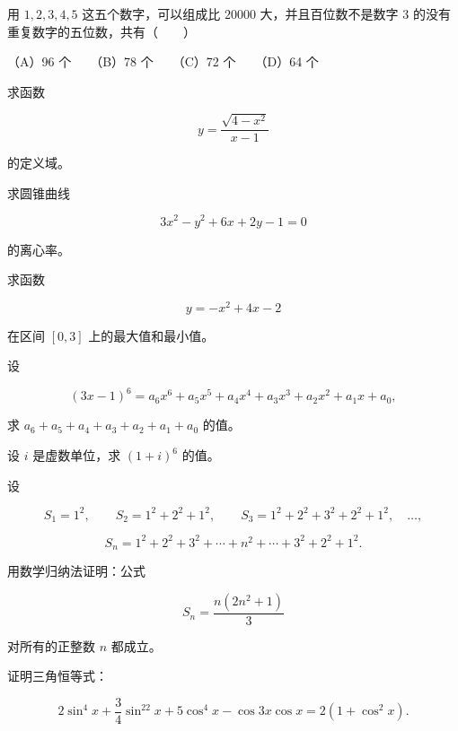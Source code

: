 \begin{question}
用 $1,2,3,4,5$ 这五个数字，可以组成比 $20000$ 大，并且百位数不是数字 $3$ 的没有重复数字的五位数，共有\mbox{（　　）}

（A）96 个　　（B）78 个　　（C）72 个　　（D）64 个

\end{question}
\begin{question}
求函数

\nopagebreak[4]
\[
y=\frac{\sqrt{4-x^2}}{x-1}
\]

的定义域。

\end{question}
\begin{question}
求圆锥曲线

\nopagebreak[4]
\[
3x^2-y^2+6x+2y-1=0
\]

的离心率。

\end{question}
\begin{question}
求函数

\nopagebreak[4]
\[
y=-x^2+4x-2
\]

在区间 $[0,3]$ 上的最大值和最小值。

\end{question}
\begin{question}
设

\nopagebreak[4]
\[
(3x-1)^6=a_6x^6+a_5x^5+a_4x^4+a_3x^3+a_2x^2+a_1x+a_0,
\]

求 $a_6+a_5+a_4+a_3+a_2+a_1+a_0$ 的值。

\end{question}
\begin{question}
设 $i$ 是虚数单位，求 $(1+i)^6$ 的值。

\end{question}
\begin{question}
设

\nopagebreak[4]
\[
S_1=1^2,\qquad
S_2=1^2+2^2+1^2,\qquad
S_3=1^2+2^2+3^2+2^2+1^2,\quad\ldots,
\]

\nopagebreak[4]
\[
S_n=1^2+2^2+3^2+\cdots+n^2+\cdots+3^2+2^2+1^2.
\]

用数学归纳法证明：公式

\nopagebreak[4]
\[
S_n=\frac{n(2n^2+1)}{3}
\]

对所有的正整数 $n$ 都成立。

\end{question}
\begin{question}
证明三角恒等式：

\nopagebreak[4]
\[
2\sin^4x+\frac34\sin^22x+5\cos^4x-\cos3x\cos x
=2(1+\cos^2x).
\]

\end{question}
